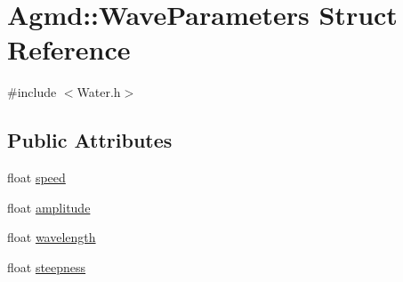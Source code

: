 \hypertarget{struct_agmd_1_1_wave_parameters}{\section{Agmd\+:\+:Wave\+Parameters Struct Reference}
\label{struct_agmd_1_1_wave_parameters}
}


{\ttfamily \#include $<$Water.\+h$>$}

\subsection*{Public Attributes}
\begin{DoxyCompactItemize}
\item 
float \hyperlink{struct_agmd_1_1_wave_parameters_aa6c1dae16ce30c1a1d378458a76513ce}{speed}
\item 
float \hyperlink{struct_agmd_1_1_wave_parameters_aab25ec6659a0ce58f80b0ef29132f17f}{amplitude}
\item 
float \hyperlink{struct_agmd_1_1_wave_parameters_a47308e64831fa72e589b7cc0f42459bc}{wavelength}
\item 
float \hyperlink{struct_agmd_1_1_wave_parameters_a16980f83ff8da1a24b02d3bfc4e30122}{steepness}
\end{DoxyCompactItemize}


